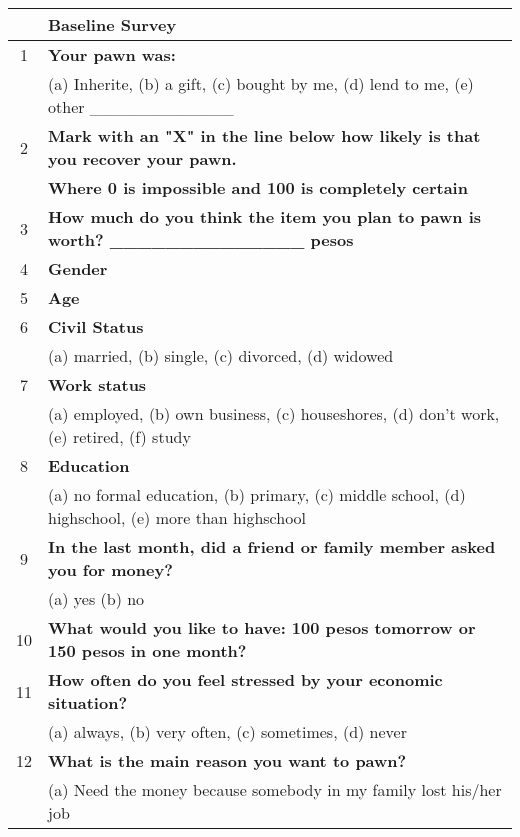 \begin{tabular}{cl}
\toprule
      & \textbf{Baseline Survey} \\
\midrule
\midrule
1     & \textbf{Your pawn was:} \\
      & (a) Inherite, (b) a gift, (c) bought by me, (d) lend to me, (e) other \_\_\_\_\_\_\_\_\_\_\_\_ \\
\rowcolor[rgb]{ .682,  .667,  .667} 2     & \textbf{Mark with an "X" in the line below how likely is that you recover your pawn. } \\
      & \textbf{Where 0 is impossible and 100 is completely certain} \\
\rowcolor[rgb]{ .682,  .667,  .667} 3     & \textbf{How much do you think the item you plan to pawn is worth?       \_\_\_\_\_\_\_\_\_\_\_\_\_\_ pesos} \\
\rowcolor[rgb]{ .682,  .667,  .667} 4     & \textbf{Gender      } \\
\rowcolor[rgb]{ .682,  .667,  .667} 5     & \textbf{Age} \\
6     & \textbf{Civil Status } \\
      & (a) married, (b) single, (c) divorced, (d) widowed \\
7     & \textbf{Work status} \\
      & (a) employed, (b) own business, (c) houseshores, (d) don't work, (e) retired, (f) study \\
\rowcolor[rgb]{ .682,  .667,  .667} 8     & \textbf{Education} \\
      & (a) no formal education, (b) primary, (c) middle school, (d) highschool, (e) more than highschool \\
\rowcolor[rgb]{ .682,  .667,  .667} 9     & \textbf{In the last month, did a friend or family member asked you for money?} \\
      & (a) yes  (b) no \\
\rowcolor[rgb]{ .682,  .667,  .667} 10    & \textbf{What would you like to have: 100 pesos tomorrow or 150 pesos in one month?} \\
\rowcolor[rgb]{ .682,  .667,  .667} 11    & \textbf{How often do you feel stressed by your economic situation?} \\
      & (a) always, (b) very often, (c) sometimes, (d) never \\
12    & \textbf{What is the main reason you want to pawn?} \\
      & (a) Need the money because somebody in my family lost his/her job \\

\end{tabular}
